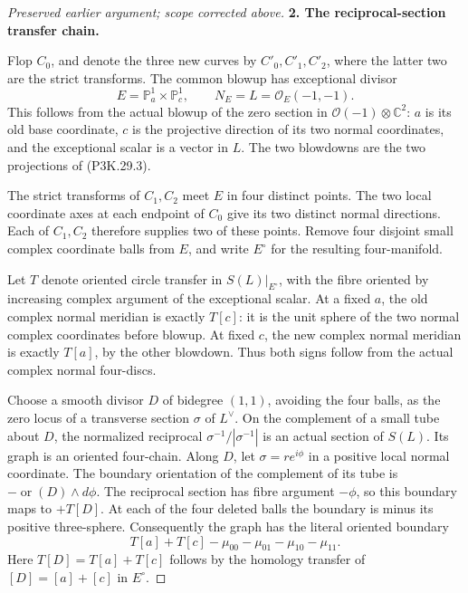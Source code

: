 \begin{proof}[Preserved earlier argument; scope corrected above]
\par\medskip\noindent\textbf{2. The reciprocal-section transfer chain.}\enspace

Flop \(C_0\), and denote the three new curves by \(C'_0,C'_1,C'_2\),
where the latter two are the strict transforms. The common blowup
has exceptional divisor
\[
          E=\mathbb P^1_a\times\mathbb P^1_c,\qquad
          N_E=L=\mathcal O_E(-1,-1).
                                                        \tag{P3K.29.3}
\]
This follows from the actual blowup of the zero section in
\(\mathcal O(-1)\otimes\mathbb C^2\): \(a\) is its old base
coordinate, \(c\) is the projective direction of its two normal
coordinates, and the exceptional scalar is a vector in \(L\).
The two blowdowns are the two projections of (P3K.29.3).

The strict transforms of \(C_1,C_2\) meet \(E\) in four distinct
points. The two local coordinate axes at each endpoint of \(C_0\)
give its two distinct normal directions. Each of \(C_1,C_2\)
therefore supplies two of these points. Remove four disjoint
small complex coordinate balls from \(E\), and write \(E^\circ\)
for the resulting four-manifold.

Let \(T\) denote oriented circle transfer in \(S(L)|_{E^\circ}\),
with the fibre oriented by increasing complex argument of the
exceptional scalar. At a fixed \(a\), the old complex normal
meridian is exactly \(T[c]\): it is the unit sphere of the two
normal complex coordinates before blowup. At fixed \(c\), the new
complex normal meridian is exactly \(T[a]\), by the other blowdown.
Thus both signs follow from the actual complex normal four-discs.

Choose a smooth divisor \(D\) of bidegree \((1,1)\), avoiding the
four balls, as the zero locus of a transverse section \(\sigma\)
of \(L^\vee\). On the complement of a small tube about \(D\),
the normalized reciprocal \(\sigma^{-1}/|\sigma^{-1}|\) is an
actual section of \(S(L)\). Its graph is an oriented four-chain.
Along \(D\), let \(\sigma=re^{i\phi}\) in a positive local normal
coordinate. The boundary orientation of the complement of its
tube is
\(-\operatorname{or}(D)\wedge d\phi\). The reciprocal section
has fibre argument \(-\phi\), so this boundary maps to
\(+T[D]\). At each of the four deleted balls the boundary is
minus its positive three-sphere. Consequently the graph has
the literal oriented boundary
\[
           T[a]+T[c]-\mu_{00}-\mu_{01}-\mu_{10}-\mu_{11}.
                                                        \tag{P3K.29.4}
\]
Here \(T[D]=T[a]+T[c]\) follows by the homology transfer of
\([D]=[a]+[c]\) in \(E^\circ\).


\end{proof}
